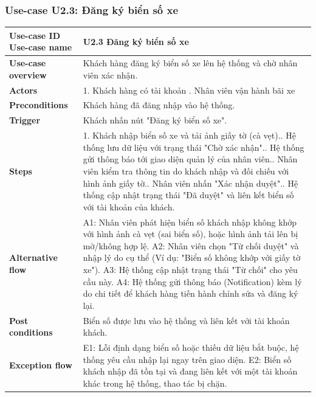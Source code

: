 \subsubsection{Use-case U2.3: Đăng ký biển số xe}
\vspace{0.5cm}
\noindent
\begin{tabularx}{\textwidth}{|>{\raggedright\arraybackslash}p{4cm}|X|}
\hline
\textbf{Use-case ID} \newline \textbf{Use-case name} & U2.3 \newline \textbf{Đăng ký biển số xe} \\ \hline
\textbf{Use-case overview} & Khách hàng đăng ký biển số xe lên hệ thống và chờ nhân viên xác nhận. \\ \hline
\textbf{Actors} & 1. Khách hàng có tài khoản \newline 2. Nhân viên vận hành bãi xe \\ \hline
\textbf{Preconditions} & Khách hàng đã đăng nhập vào hệ thống. \\ \hline
\textbf{Trigger} & Khách nhấn nút "Đăng ký biển số xe". \\ \hline

\textbf{Steps} &
1. Khách nhập biển số xe và tải ảnh giấy tờ (cà vẹt).\newline
2. Hệ thống lưu dữ liệu với trạng thái "Chờ xác nhận".\newline
3. Hệ thống gửi thông báo tới giao diện quản lý của nhân viên.\newline
4. Nhân viên kiểm tra thông tin do khách nhập và đối chiếu với hình ảnh giấy tờ.\newline
5. Nhân viên nhấn "Xác nhận duyệt".\newline
6. Hệ thống cập nhật trạng thái "Đã duyệt" và liên kết biển số với tài khoản của khách. \\ \hline

\textbf{Alternative flow} &
A1: Nhân viên phát hiện biển số khách nhập không khớp với hình ảnh cà vẹt (sai biển số), hoặc hình ảnh tải lên bị mờ/không hợp lệ.\newline
A2: Nhân viên chọn "Từ chối duyệt" và nhập lý do cụ thể (Ví dụ: "Biển số không khớp với giấy tờ xe").\newline
A3: Hệ thống cập nhật trạng thái "Từ chối" cho yêu cầu này.\newline
A4: Hệ thống gửi thông báo (Notification) kèm lý do chi tiết để khách hàng tiến hành chỉnh sửa và đăng ký lại. \\ \hline

\textbf{Post conditions} & Biển số được lưu vào hệ thống và liên kết với tài khoản khách. \\ \hline

\textbf{Exception flow} &
E1: Lỗi định dạng biển số hoặc thiếu dữ liệu bắt buộc, hệ thống yêu cầu nhập lại ngay trên giao diện.\newline
E2: Biển số khách nhập đã tồn tại và đang liên kết với một tài khoản khác trong hệ thống, thao tác bị chặn. \\ \hline
\end{tabularx}

